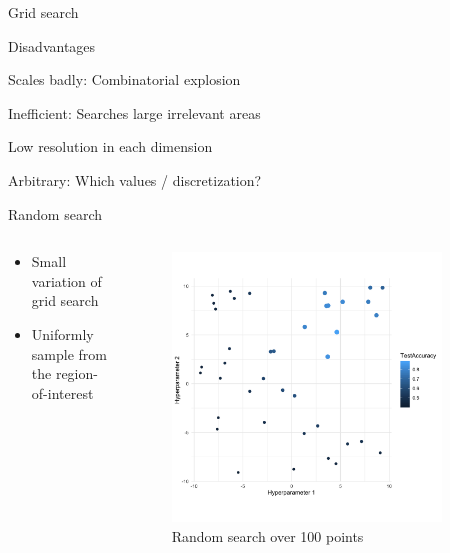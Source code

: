 \begin{frame}{Grid search}
\begin{blocki}{Disadvantages}
\item Scales badly: Combinatorial explosion
\item Inefficient: Searches large irrelevant areas
\item Low resolution in each dimension
\item Arbitrary: Which values / discretization?
\end{blocki}
\end{frame}


\begin{frame}{Random search}



\begin{columns}
\begin{column}{0.49\textwidth}
\begin{itemize}
\item Small variation of grid search
\item Uniformly sample from the region-of-interest
\end{itemize}
\end{column}
\begin{column}{0.49\textwidth}
\vspace*{-0.8cm}
\begin{center}
\begin{figure}
\includegraphics[width=0.9\textwidth]{images/random.png}
\caption*{Random search over 100 points}
\end{figure}
\end{center}
\end{column}
\end{columns}


\end{frame}
